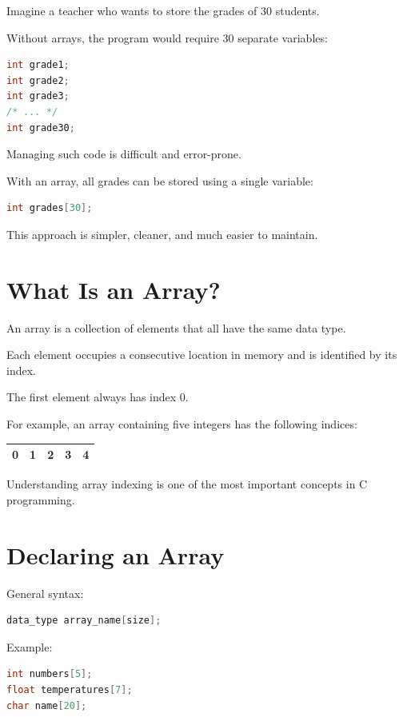 \documentclass[12pt,openany]{book}
\begin{document}
Imagine a teacher who wants to store the grades of 30 students.

Without arrays, the program would require 30 separate variables:

\begin{lstlisting}[language=C]
int grade1;
int grade2;
int grade3;
/* ... */
int grade30;
\end{lstlisting}

Managing such code is difficult and error-prone.

With an array, all grades can be stored using a single variable:

\begin{lstlisting}[language=C]
int grades[30];
\end{lstlisting}

This approach is simpler, cleaner, and much easier to maintain.

\section{What Is an Array?}

An array is a collection of elements that all have the same data type.

Each element occupies a consecutive location in memory and is identified by its index.

The first element always has index 0.

For example, an array containing five integers has the following indices:

\begin{center}
\begin{tabular}{|c|c|c|c|c|}
\hline
0 & 1 & 2 & 3 & 4 \\
\hline
\end{tabular}
\end{center}

Understanding array indexing is one of the most important concepts in C programming.
\section{Declaring an Array}

General syntax:

\begin{lstlisting}[language=C]
data_type array_name[size];
\end{lstlisting}

Example:

\begin{lstlisting}[language=C]
int numbers[5];
float temperatures[7];
char name[20];
\end{lstlisting}
\end{document}
